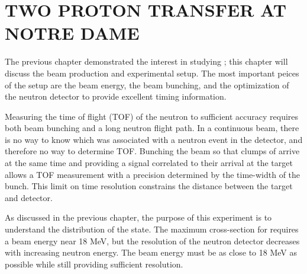 %
%
%
%
%
%
%
%

%
%

\chapter{TWO PROTON TRANSFER AT NOTRE DAME}
\label{chap:2pExpt}

The previous chapter demonstrated the interest in studying \reaction ; this chapter will discuss the beam production and experimental setup.  The most important peices of the setup are the beam energy, the beam bunching, and the optimization of the neutron detector to provide excellent timing information.   

Measuring the time of flight (TOF) of the neutron to sufficient accuracy requires both beam bunching and a long neutron flight path.  In a continuous beam, there is no way to know which  was associated with a neutron event in the detector, and therefore no way to determine TOF.  Bunching the beam so that clumps of  arrive at the same time and providing a signal correlated to their arrival at the target allows a TOF measurement with a precision determined by the time-width of the bunch.  This limit on time resolution constrains the distance between the target and detector.  

As discussed in the previous chapter, the purpose of this experiment is to understand the distribution of the \zp state.  The maximum \zp cross-section for \reaction requires a beam energy near 18 MeV, but the resolution of the neutron detector decreases with increasing neutron energy.  The beam energy must be as close to 18 MeV as possible while still providing sufficient resolution.

